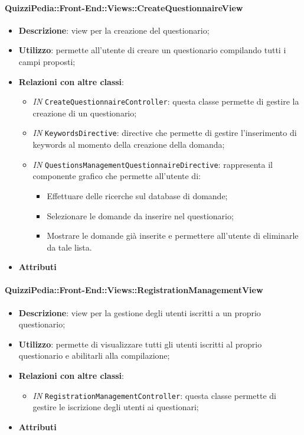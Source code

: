 \paragraph{QuizziPedia::Front-End::Views::CreateQuestionnaireView}
\begin{itemize}
	\item \textbf{Descrizione}: view per la creazione del questionario;
	\item \textbf{Utilizzo}: permette all'utente di creare un questionario compilando tutti i campi proposti;
	\item \textbf{Relazioni con altre classi}:
	\begin{itemize}
		\item \textit{IN} \texttt{CreateQuestionnaireController}: questa classe permette di gestire la creazione di un questionario;
		\item \textit{IN} \texttt{KeywordsDirective}: directive che permette di gestire l'inserimento di keywords al momento della creazione della domanda;
		\item \textit{IN} \texttt{QuestionsManagementQuestionnaireDirective}: rappresenta il componente grafico che permette all'utente di:
		\begin{itemize}
			\item Effettuare delle ricerche sul database di domande;
			\item Selezionare le domande da inserire nel questionario;
			\item Mostrare le domande già inserite e permettere all'utente di eliminarle da tale lista.
			\end{itemize}
	\end{itemize}
	\item \textbf{Attributi}
\end{itemize}

\paragraph{QuizziPedia::Front-End::Views::RegistrationManagementView}
\begin{itemize}
	\item \textbf{Descrizione}: view per la gestione degli utenti iscritti a un proprio questionario;
	\item \textbf{Utilizzo}: permette di visualizzare tutti gli utenti iscritti al proprio questionario e abilitarli alla compilazione;
	\item \textbf{Relazioni con altre classi}:
	\begin{itemize}
		\item \textit{IN} \texttt{RegistrationManagementController}: questa classe permette di gestire le iscrizione degli utenti ai questionari;
	\end{itemize}
	\item \textbf{Attributi}
\end{itemize}

